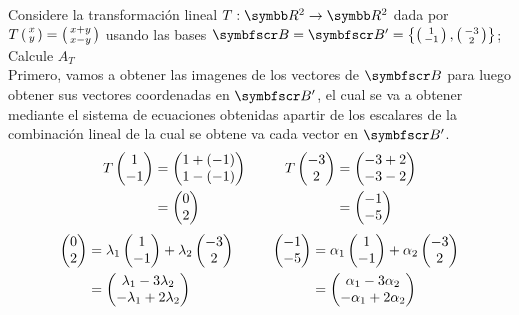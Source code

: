 \item Considere la transformación lineal \(T: \realR^2 \rightarrow \realR^2\) dada por 
    \(T\fsmvec{x,y} = \fsmvec{x+y,x-y}\) usando las bases \(\fb = \fb' = \fset{\fsmvec{1,-1}, \fsmvec{-3,2}}\); Calcule \(A_{T}\) \\
    Primero, vamos a obtener las imagenes de los vectores de \(\fb\) para luego obtener sus vectores coordenadas en \(\fb'\), 
    el cual se va a obtener mediante el sistema de ecuaciones obtenidas apartir de los escalares de la combinación lineal de la cual se obtene va cada vector en \(\fb'\).
    \[
        \begin{aligned}
            T\fvec{1,-1} &= \fvec{1 + (-1),1 - (-1)} \\
            &= \fvec{0,2}
        \end{aligned}
        \hspace{1cm}
        \begin{aligned}
            T\fvec{-3,2} &= \fvec{-3 + 2,-3 - 2} \\
            &= \fvec{-1,-5}
        \end{aligned}
    \]
    \[
        \begin{aligned}
            \fvec{0,2} &= \lambda_1 \fvec{1,-1} + \lambda_2 \fvec{-3,2} \\
            &= \fvec{\lambda_1 -3\lambda_2, -\lambda_1 + 2\lambda_2} \\
        \end{aligned}
        \hspace{1cm}
        \begin{aligned}
            \fvec{-1,-5} &= \alpha_1 \fvec{1,-1} + \alpha_2 \fvec{-3,2} \\
            &= \fvec{\alpha_1 - 3\alpha_2, -\alpha_1 + 2\alpha_2} \\
        \end{aligned}
    \]
